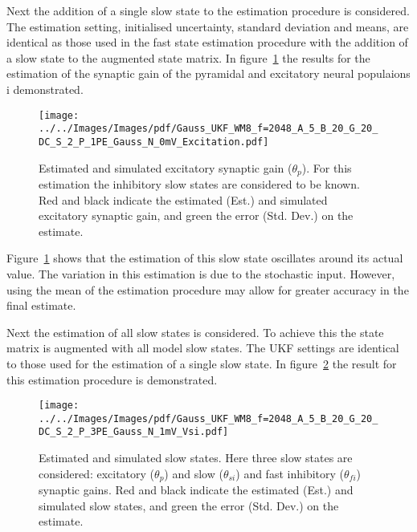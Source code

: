 Next the addition of a single slow state to the estimation procedure is considered. The estimation setting, initialised uncertainty, standard deviation and means, are identical as those used in the fast state estimation procedure with the addition of a slow state to the augmented state matrix. In figure~\ref{fig: ESTOSFP} the results for the estimation of the synaptic gain of the pyramidal and excitatory neural populaions i demonstrated. 

\begin{figure}
	\centering
		\texttt{[image: ../../Images/Images/pdf/Gauss\_UKF\_WM8\_f=2048\_A\_5\_B\_20\_G\_20\_DC\_S\_2\_P\_1PE\_Gauss\_N\_0mV\_Excitation.pdf]}
	\caption{Estimated and simulated excitatory synaptic gain ($\theta_{p}$). For this estimation the inhibitory slow states are considered to be known. Red and black indicate the estimated (Est.) and simulated excitatory synaptic gain, and green the error (Std. Dev.) on the estimate.}
	\label{fig: ESTOSFP}
\end{figure}

Figure~\ref{fig: ESTOSFP} shows that the estimation of this slow state oscillates around its actual value. The variation in this estimation is due to the stochastic input. However, using the mean of the estimation procedure may allow for greater accuracy in the final estimate.


Next the estimation of all slow states is considered. To achieve this the state matrix is augmented with all model slow states. The UKF settings are identical to those used for the estimation of a single slow state. In figure~\ref{fig: ESTMP3} the result for this estimation procedure is demonstrated.
\begin{figure}%
	\centering
		\texttt{[image: ../../Images/Images/pdf/Gauss\_UKF\_WM8\_f=2048\_A\_5\_B\_20\_G\_20\_DC\_S\_2\_P\_3PE\_Gauss\_N\_1mV\_Vsi.pdf]}
	\caption{Estimated and simulated slow states. Here three slow states are considered: excitatory ($\theta_{p}$) and slow ($\theta_{si}$) and fast inhibitory ($\theta_{fi}$) synaptic gains. Red and black indicate the estimated (Est.) and simulated slow states, and green the error (Std. Dev.) on the estimate.}
	\label{fig: ESTMP3}
\end{figure}%


